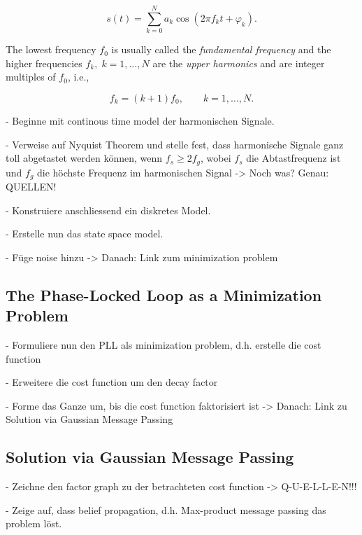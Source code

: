 \begin{equation}
\label{eq: harmonic signal raw}
s(t) = \sum_{k=0}^N a_k \cos \left( 2 \pi f_k t + \varphi_k \right) .
\end{equation}

The lowest frequency $f_0$ is usually called the \emph{fundamental frequency} and the higher frequencies $f_k,\; k=1, \ldots, N$ are the \emph{upper harmonics} and are integer multiples of $f_0$, i.e.,

\begin{equation*}
\label{eq: upper harmonics}
f_k = (k+1) f_0, \qquad k = 1, \ldots, N.
\end{equation*}





\noindent - Beginne mit continous time model der harmonischen Signale.

\noindent - Verweise auf Nyquist Theorem und stelle fest, dass harmonische Signale ganz toll abgetastet werden können, wenn $f_s \geq 2f_g$, wobei $f_s$ die Abtastfrequenz ist und $f_g$ die höchste Frequenz im harmonischen Signal -> Noch was? Genau: QUELLEN!

\noindent - Konstruiere anschliessend ein diskretes Model.

\noindent - Erstelle nun das state space model.

\noindent - Füge noise hinzu -> Danach: Link zum minimization problem


\subsection{The Phase-Locked Loop as a Minimization Problem}

- Formuliere nun den PLL als minimization problem, d.h. erstelle die cost function

\noindent - Erweitere die cost function um den decay factor

\noindent - Forme das Ganze um, bis die cost function faktorisiert ist -> Danach: Link zu Solution via Gaussian Message Passing

\subsection{Solution via Gaussian Message Passing}

- Zeichne den factor graph zu der betrachteten cost function -> Q-U-E-L-L-E-N!!!

\noindent - Zeige auf, dass belief propagation, d.h. Max-product message passing das problem löst.


